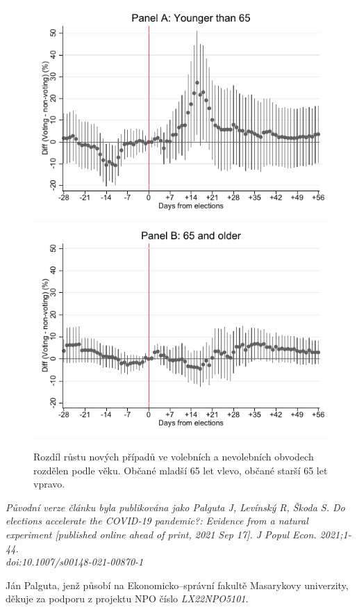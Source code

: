   
\begin{figure}[ht]
    \centering
    \includegraphics[scale=0.58]{Covid+_growth_rate14_less65.pdf} 
    \includegraphics[scale=0.58]{Covid+_growth_rate14_older65.pdf} 
    \caption{Rozdíl růstu nových případů ve volebních a nevolebních obvodech rozdělen podle věku. Občané mladší 65 let vlevo, občané starší 65 let vpravo.}
 \label{fig:heterogen_age}
\end{figure}

\vspace{2eM}
\noindent \it Původní verze článku byla publikována jako
Palguta J, Levínský R, Škoda S. Do elections accelerate the COVID-19 pandemic?: Evidence from a natural experiment [published online ahead of print, 2021 Sep 17]. J Popul Econ. 2021;1-44.\\ doi:10.1007/s00148-021-00870-1

\vspace{2eM}
\noindent Ján Palguta, jenž působí na Ekonomicko--správní fakultě Masarykovy univerzity, děkuje za podporu z projektu NPO  číslo {\em LX22NPO5101}.
